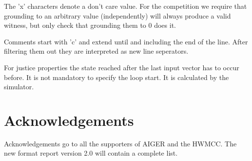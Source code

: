 \documentclass{llncs}
\begin{document}
The 'x' characters denote a don't care value.  For the competition
we require that grounding to an arbitrary value (independently) will
always produce a valid witness, but only check that grounding them
to 0 does it. 

Comments start with 'c' and extend until and including the end of the line.
After filtering them out they are interpreted as new line seperators.

For justice properties the state reached after the last input vector
has to occur before.  It is not mandatory to specify the
loop start.  It is calculated by the simulator.

\section{Acknowledgements}

Acknowledgements go to all the supporters of AIGER and the HWMCC.
The new format report version 2.0 will contain a complete list.
\end{document}
